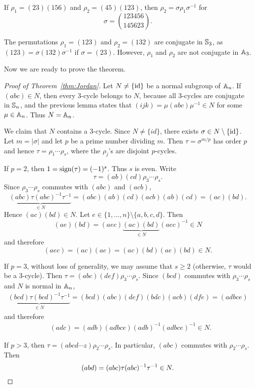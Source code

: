 \begin{example}
If $\rho_1=(23)(156)$ and $\rho_2=(45)(123)$, then 
$\rho_2=\sigma\rho_1\sigma^{-1}$ for  
\[
\sigma=\binom{123456}{145623}.
\]
\end{example}

\begin{example}
The permutations $\rho_1=(123)$ and $\rho_2=(132)$ are conjugate 
in $\mathbb{S}_3$, as  
$(123)=\sigma(132)\sigma^{-1}$ if $\sigma=(23)$. However, $\rho_1$ and $\rho_2$ are not conjugate in $\mathbb{A}_3$. 
\end{example}

Now we are ready to prove the theorem. 

\begin{proof}[Proof of Theorem~\ref{thm:Jordan}]
Let $N\ne\{\operatorname{id}\}$ be a normal subgroup of $\mathbb{A}_n$. If $(abc)\in N$, then every 3-cycle belongs to $N$, because all 3-cycles 
are conjugate in $\mathbb{S}_n$, and the previous lemma 
states that 
$(ijk)=\mu(abc)\mu^{-1}\in N$ for some
$\mu\in\mathbb{A}_n$. Thus $N=\mathbb{A}_n$. 

We claim that $N$ contains a 3-cycle. 
Since $N\ne\{id\}$, there exists $\sigma\in N\setminus\{\operatorname{id}\}$. Let $m=|\sigma|$ and let $p$ be a prime number dividing $m$. 
Then $\tau=\sigma^{m/p}$ has order $p$ and hence
$\tau=\rho_1\cdots\rho_s$, where the $\rho_j$'s are disjoint 
$p$-cycles. 

If $p=2$, then $1=\operatorname{sign}(\tau)=(-1)^s$. Thus $s$ is even. Write
\[
\tau=(ab)(cd)\rho_3\cdots\rho_s. 
\]
Since $\rho_3\cdots\rho_s$ commutes with $(abc)$ and $(acb)$, 
\[
\underbrace{(abc)\tau(abc)^{-1}\tau^{-1}}_{\in N}
=(abc)(ab)(cd)(acb)(ab)(cd)=(ac)(bd).
\]
Hence $(ac)(bd)\in N$. Let 
$e\in\{1,\dots,n\}\setminus\{a,b,c,d\}$. Then 
\[
(ae)(bd)=(aec)\underbrace{(ac)(bd)}_{\in N}(aec)^{-1}\in N
\]
and therefore  
\[
(aec)=(ac)(ae)=(ac)(bd)(ae)(bd)\in N.
\]

If $p=3$, without loss of generality, we may assume that $s\geq2$ (otherwise, $\tau$ would be a 3-cycle). Then
$\tau=(abc)(def)\rho_3\cdots\rho_s$. Since $(bcd)$ commutes with
$\rho_3\cdots\rho_s$ and $N$ is normal in $\mathbb{A}_n$, 
\begin{align*}
\underbrace{(bcd)\tau(bcd)^{-1}\tau^{-1}}_{\in N}=(bcd)(abc)(def)(bdc)(acb)(dfe)=(adbce)
\end{align*}
and therefore 
\begin{align*}
&(adc)=(adb)(adbce)(adb)^{-1}(adbce)^{-1}\in N.
\end{align*}

If $p>3$, then $\tau=(abcd\cdots z)\rho_2\cdots\rho_s$. In particular, $(abc)$ commutes with $\rho_2\cdots\rho_s$. Then 
\[
(abd)=(abc)\tau(abc)^{-1}\tau^{-1}\in N.\qedhere
\]
\end{proof}

